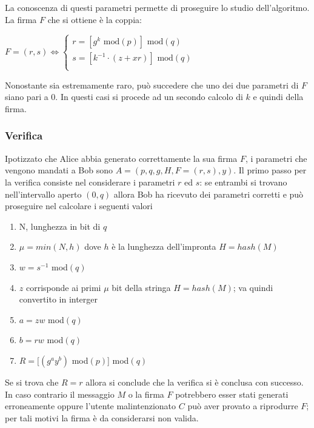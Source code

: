 \documentclass[a4paper,12pt]{tesiinfo}
\begin{document}
La conoscenza di questi parametri permette di proseguire lo studio dell'algoritmo.
La firma $F$ che si ottiene \`e la coppia:
\begin{center}
 $F =(r, s) \iff
 \begin{cases}
 r=[g^k \text{ mod}(p)] \text{ mod}(q)\\
 s=[k^{-1} \cdot (z+xr)] \text{ mod}(q)\\
\end{cases}$
\end{center}
Nonostante sia estremamente raro, pu\`o succedere che uno dei due parametri di $F$ siano pari a 0. In questi casi si procede ad un secondo calcolo di $k$ e quindi della firma.
\subsubsection{Verifica}
Ipotizzato che Alice abbia generato correttamente la sua firma $F$, i parametri che vengono mandati a Bob sono $A = (p, q, g, H, F=(r, s), y)$. Il primo passo per la verifica consiste nel considerare i parametri $r$ ed $s$: se entrambi si trovano nell'intervallo aperto $(0, q)$ allora Bob ha ricevuto dei parametri corretti e pu\`o proseguire nel calcolare i seguenti valori
\begin{enumerate}
 \item N, lunghezza in bit di $q$
 \item $\mu = min(N, h)$ dove $h$ \`e la lunghezza dell'impronta $H=hash(M)$
 \item $w = s^{-1}$ mod$(q)$
 \item $z$ corrisponde ai primi $\mu$ bit della stringa $H=hash(M)$; va quindi convertito in interger
 \item $a = zw $ mod$(q)$
 \item $b = rw $ mod$(q)$
 \item $R = [(g^ay^b) $ mod$(p)$] mod$(q)$
\end{enumerate}
Se si trova che $R = r$ allora si conclude che la verifica si \`e conclusa con successo. In caso contrario il messaggio $M$ o la firma $F$ potrebbero esser stati generati erroneamente oppure l'utente malintenzionato $C$ pu\`o aver provato a riprodurre $F$; per tali motivi la firma \`e da considerarsi non valida. 
%
%
%
%
%
%
%
%
%
%
%
%
%
\end{document}
